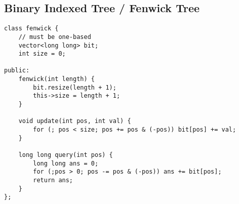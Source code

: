 \subsection{Binary Indexed Tree / Fenwick Tree}
\begin{lstlisting}
class fenwick {
    // must be one-based
    vector<long long> bit;
    int size = 0;

public:
    fenwick(int length) {
        bit.resize(length + 1);
        this->size = length + 1;
    }

    void update(int pos, int val) {
        for (; pos < size; pos += pos & (-pos)) bit[pos] += val;
    }

    long long query(int pos) {
        long long ans = 0;
        for (;pos > 0; pos -= pos & (-pos)) ans += bit[pos];
        return ans;
    }
};
\end{lstlisting}